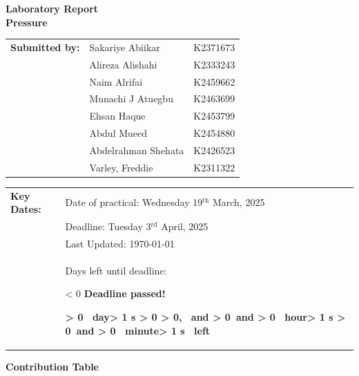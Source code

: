 \documentclass{article}
\newcounter{deadlineyear}\setcounter{deadlineyear}{2025}
\newcounter{deadlinemonth}\setcounter{deadlinemonth}{4}
\newcounter{deadlineday}\setcounter{deadlineday}{3}
\newcounter{mydatenumber}  %
\newcounter{currentdate}   %
\newcounter{daysdiff}      %
\newcounter{currenttime}   %
\newcounter{totalminutes}  %
\newcounter{displaydays}   %
\newcounter{remainingmins} %
\newcounter{displayhours}  %
\newcounter{displaymins}   %
\newcommand{\timeUntilDeadline}{%
	\setmydatenumber{mydatenumber}{\thedeadlineyear}{\thedeadlinemonth}{\thedeadlineday}%
	\setmydatenumber{currentdate}{\the\year}{\the\month}{\the\day}%
	\setcounter{daysdiff}{\themydatenumber - \thecurrentdate}%
	
	\setcounter{currenttime}{\time}%
	
	\setcounter{totalminutes}{\numexpr\thedaysdiff * 1440 - \thecurrenttime}%
	
	\ifnum\thetotalminutes < 0
	\textbf{\color{red}Deadline passed!}%
	\else
	\setcounter{displaydays}{\thetotalminutes / 1440}%
	\setcounter{remainingmins}{\numexpr\thetotalminutes - \thedisplaydays * 1440}%
	\setcounter{displayhours}{\theremainingmins / 60}%
	\setcounter{displaymins}{\numexpr\theremainingmins - \thedisplayhours * 60}%
	
	\textbf{%
		\ifnum\thedisplaydays > 0
		\thedisplaydays\ day\ifnum\thedisplaydays > 1 s\fi%
		\ifnum\thedisplayhours > 0
		\ifnum\thedisplaymins > 0, \else\ and \fi%
		\else
		\ifnum\thedisplaymins > 0\ and \fi%
		\fi%
		\fi%
		\ifnum\thedisplayhours > 0
		\thedisplayhours\ hour\ifnum\thedisplayhours > 1 s\fi%
		\ifnum\thedisplaymins > 0\ and \fi%
		\fi%
		\ifnum\thedisplaymins > 0
		\thedisplaymins\ minute\ifnum\thedisplaymins > 1 s\fi%
		\fi%
		\ left}%
	\fi
}
\begin{document}
	
	\vspace*{\fill}
	\begin{center}
		\textbf{\Huge Laboratory Report}\\[10pt]
		\LARGE \textbf{Pressure}
	\end{center}
	\vspace*{\fill}
	
	\Large    
	\begin{tabular}{@{}l l l@{}}
		\textbf{Submitted by:} & Sakariye Abiikar & K2371673 \\
		& Alireza Alishahi & K2333243 \\
		& Naim Alrifai & K2459662 \\
		& Munachi J Atuegbu & K2463699 \\
		& Ehsan Haque & K2453799 \\
		& Abdul Mueed & K2454880 \\   
		& Abdelrahman Shehata & K2426523 \\   
		& Varley, Freddie & K2311322
	\end{tabular}
	
	\vspace*{\fill}
	
	\begin{tabular}{@{}l l@{}}
		\textbf{Key Dates:} & Date of practical: Wednesday 19$^{\text{th}}$ March, 2025 \\
		& Deadline: Tuesday 3$^{\text{rd}}$ April, 2025 \\
		& Last Updated: \today\, \currenttime\\
		& Days left until deadline: \timeUntilDeadline \\
	\end{tabular}
	\vspace*{\fill}
	
	\large
	\newpage\noindent	\vspace*{-1em}
	
	\begin{center}
		\LARGE \textbf{Contribution Table}\\[3em]
	\end{center}	
	
\end{document}

